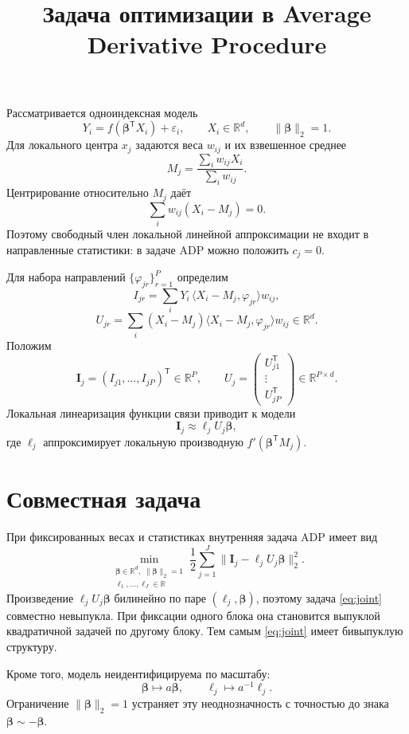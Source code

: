 \documentclass[11pt,a4paper]{article}
\title{Задача оптимизации в Average Derivative Procedure}
\author{}
\date{}
\newcommand{\R}{\mathbb{R}}
\newcommand{\T}{\mathsf{T}}
\begin{document}
\maketitle
\vspace{-1.5em}

Рассматривается одноиндексная модель
\[
Y_i=f(\bm\beta^{\T}X_i)+\varepsilon_i,
\qquad
X_i\in\R^d,
\qquad
\|\bm\beta\|_2=1.
\]
Для локального центра $x_j$ задаются веса $w_{ij}$ и их взвешенное среднее
\[
M_j=\frac{\sum_i w_{ij}X_i}{\sum_i w_{ij}}.
\]
Центрирование относительно $M_j$ даёт
\[
\sum_i w_{ij}(X_i-M_j)=0.
\]
Поэтому свободный член локальной линейной аппроксимации не входит в направленные статистики: в задаче ADP можно положить $c_j=0$.

Для набора направлений $\{\varphi_{jr}\}_{r=1}^{P}$ определим
\[
I_{jr}
=
\sum_i Y_i\,\langle X_i-M_j,\varphi_{jr}\rangle w_{ij},
\]
\[
U_{jr}
=
\sum_i (X_i-M_j)
\langle X_i-M_j,\varphi_{jr}\rangle w_{ij}
\in\R^d.
\]
Положим
\[
\bm I_j=(I_{j1},\ldots,I_{jP})^{\T}\in\R^P,
\qquad
U_j=
\begin{pmatrix}
U_{j1}^{\T}\\
\vdots\\
U_{jP}^{\T}
\end{pmatrix}
\in\R^{P\times d}.
\]
Локальная линеаризация функции связи приводит к модели
\[
\bm I_j\approx \ell_jU_j\bm\beta,
\]
где $\ell_j$ аппроксимирует локальную производную
$f'(\bm\beta^{\T}M_j)$.

\section*{Совместная задача}
При фиксированных весах и статистиках внутренняя задача ADP имеет вид
\begin{equation}
\min_{\substack{\bm\beta\in\R^d,\;\|\bm\beta\|_2=1\\
\ell_1,\ldots,\ell_J\in\R}}
\frac12\sum_{j=1}^{J}
\|\bm I_j-\ell_jU_j\bm\beta\|_2^2.
\label{eq:joint}
\end{equation}
Произведение $\ell_jU_j\bm\beta$ билинейно по паре $(\ell_j,\bm\beta)$, поэтому задача \eqref{eq:joint} совместно невыпукла. При фиксации одного блока она становится выпуклой квадратичной задачей по другому блоку. Тем самым \eqref{eq:joint} имеет бивыпуклую структуру.

Кроме того, модель неидентифицируема по масштабу:
\[
\bm\beta\mapsto a\bm\beta,
\qquad
\ell_j\mapsto a^{-1}\ell_j.
\]
Ограничение $\|\bm\beta\|_2=1$ устраняет эту неоднозначность с точностью до знака $\bm\beta\sim-\bm\beta$.
\end{document}
